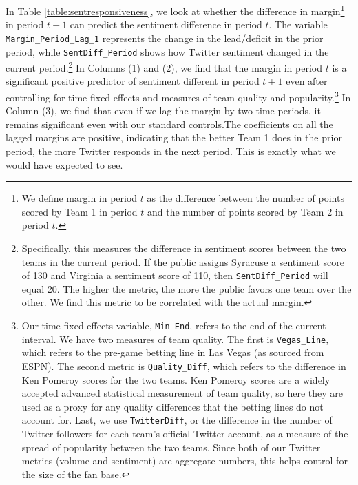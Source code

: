 \documentclass[12pt]{article}
\begin{document}
\begin{doublespacing}
In Table \ref{table:sentresponsiveness}, we look at whether the difference in margin\footnote{We define margin in period $t$ as the difference between the number of points scored by Team 1 in period $t$ and the number of points scored by Team 2 in period $t$.} in period $t-1 $ can predict the sentiment difference in period $t$. The variable \texttt{Margin\_Period\_Lag\_1} represents the change in the lead/deficit in the prior period, while \texttt{SentDiff\_Period} shows how Twitter sentiment changed in the current period.\footnote{Specifically, this measures the difference in sentiment scores between the two teams in the current period. If the public assigns Syracuse a sentiment score of 130 and Virginia a sentiment score of 110, then \texttt{SentDiff\_Period} will equal 20. The higher the metric, the more the public favors one team over the other. We find this metric to be correlated with the actual margin.} In Columns (1) and (2), we find that the margin in period $t$ is a significant positive predictor of sentiment different in period $t+1$ even after controlling for time fixed effects and measures of team quality and popularity.\footnote{Our time fixed effects variable, \texttt{Min\_End}, refers to the end of the current interval. We have two measures of team quality. The first is \texttt{Vegas\_Line}, which refers to the pre-game betting line in Las Vegas (as sourced from ESPN). The second metric is \texttt{Quality\_Diff}, which refers to the difference in Ken Pomeroy scores for the two teams. Ken Pomeroy scores are a widely accepted advanced statistical measurement of team quality, so here they are used as a proxy for any quality differences that the betting lines do not account for. Last, we use \texttt{TwitterDiff}, or the difference in the number of Twitter followers for each team's official Twitter account, as a measure of the spread of popularity between the two teams. Since both of our Twitter metrics (volume and sentiment) are aggregate numbers, this helps control for the size of the fan base.} In Column (3), we find that even if we lag the margin by two time periods, it remains significant even with our standard controls.The coefficients on all the lagged margins are positive, indicating that the better Team 1 does in the prior period, the more Twitter responds in the next period. This is exactly what we would have expected to see. 


\end{doublespacing}
\end{document}
